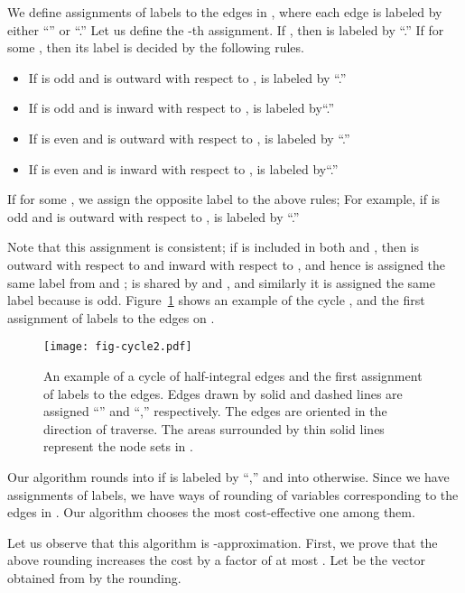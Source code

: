 \documentclass{article}
\begin{document}
We define  assignments of labels to the edges in , 
where each edge is labeled by either ``'' or ``.''
Let us define the -th assignment.
If , then  is labeled by ``.'' If  for
some , then its label is decided by the following rules.
\begin{itemize}
\item If  is odd and  is outward with respect to ,
 is labeled by ``.''
\item If  is odd and  is inward with respect to ,
 is labeled by``.''
\item If  is even and  is outward with respect to ,
 is labeled by ``.''
\item If  is even and  is inward with respect to , 
 is labeled by``.''
\end{itemize}
If  for some , we assign the opposite label to the
above rules; For example, if
 is odd and  is outward with respect to ,
 is labeled by ``.''

Note that this assignment is consistent;
if
 is included in both  and , then
 is outward with respect to  and inward with respect to
,
and hence  is assigned the same label from  and ;
 is shared by  and , and similarly it is assigned the same label 
because  is odd.
Figure~\ref{fig.cicle2} shows an example of the cycle , and the first
assignment of labels to the edges on .

\begin{figure}
 \centering
 \texttt{[image: fig-cycle2.pdf]}
\caption{An example of a cycle of half-integral edges and the first
 assignment of labels to the edges. 
Edges drawn by 
solid and dashed lines are assigned ``'' and ``,'' respectively.
The edges are oriented in the direction of traverse. The areas surrounded by thin solid lines
represent the node sets in .}
\label{fig.cicle2}
\end{figure}


Our algorithm rounds  into  if  is labeled by ``,''
and into  otherwise. 
Since we have  assignments of labels, we have  ways of rounding of
variables corresponding to the edges in .
Our algorithm chooses the most cost-effective one among them.

Let us observe that this algorithm is -approximation. First, we
prove that the above rounding increases the cost by a factor of at most .
Let  be the vector obtained from  by the rounding.
\end{document}
